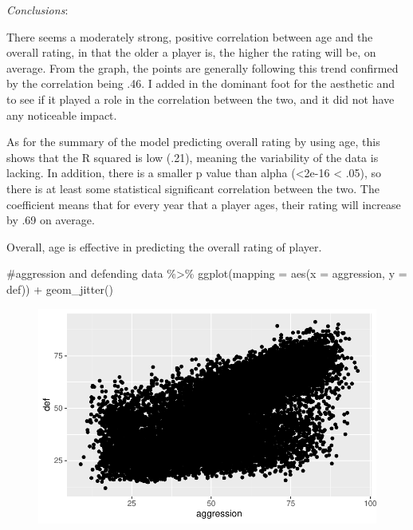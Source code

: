 \documentclass[
  letterpaper,
  DIV=11,
  numbers=noendperiod]{scrartcl}
\newenvironment{Shaded}{\begin{snugshade}}{\end{snugshade}}
\newcommand{\AttributeTok}[1]{\textcolor[rgb]{0.40,0.45,0.13}{#1}}
\newcommand{\CommentTok}[1]{\textcolor[rgb]{0.37,0.37,0.37}{#1}}
\newcommand{\FunctionTok}[1]{\textcolor[rgb]{0.28,0.35,0.67}{#1}}
\newcommand{\NormalTok}[1]{\textcolor[rgb]{0.00,0.23,0.31}{#1}}
\newcommand{\SpecialCharTok}[1]{\textcolor[rgb]{0.37,0.37,0.37}{#1}}
\begin{document}
\emph{Conclusions}:

There seems a moderately strong, positive correlation between age and
the overall rating, in that the older a player is, the higher the rating
will be, on average. From the graph, the points are generally following
this trend confirmed by the correlation being .46. I added in the
dominant foot for the aesthetic and to see if it played a role in the
correlation between the two, and it did not have any noticeable impact.

As for the summary of the model predicting overall rating by using age,
this shows that the R squared is low (.21), meaning the variability of
the data is lacking. In addition, there is a smaller p value than alpha
(\textless2e-16 \textless{} .05), so there is at least some statistical
significant correlation between the two. The coefficient means that for
every year that a player ages, their rating will increase by .69 on
average.

Overall, age is effective in predicting the overall rating of player.

\begin{Shaded}
\begin{Highlighting}[]
\CommentTok{\#aggression and defending}
\NormalTok{data }\SpecialCharTok{\%\textgreater{}\%} 
  \FunctionTok{ggplot}\NormalTok{(}\AttributeTok{mapping =} \FunctionTok{aes}\NormalTok{(}\AttributeTok{x =}\NormalTok{ aggression, }\AttributeTok{y =}\NormalTok{ def)) }\SpecialCharTok{+} 
  \FunctionTok{geom\_jitter}\NormalTok{()}
\end{Highlighting}
\end{Shaded}

\begin{figure}[H]

{\centering \includegraphics{FIFA21_files/figure-pdf/unnamed-chunk-12-1.pdf}

}

\end{figure}
\end{document}

